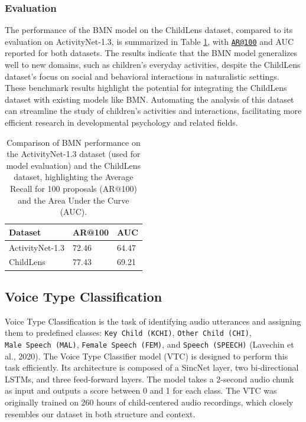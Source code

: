 \documentclass[
  man,floatsintext]{apa6}
\begin{document}
\subsubsection{Evaluation}\label{evaluation}

The performance of the BMN model on the ChildLens dataset, compared to its evaluation on ActivityNet-1.3, is summarized in Table \ref{tab:bmn-results}, with \href{mailto:AR@100}{\nolinkurl{AR@100}} and AUC reported for both datasets. The results indicate that the BMN model generalizes well to new domains, such as children's everyday activities, despite the ChildLens dataset's focus on social and behavioral interactions in naturalistic settings. These benchmark results highlight the potential for integrating the ChildLens dataset with existing models like BMN. Automating the analysis of this dataset can streamline the study of children's activities and interactions, facilitating more efficient research in developmental psychology and related fields.

\begin{table}[tbp]

\begin{center}
\begin{threeparttable}

\caption{\label{tab:bmn-results}Comparison of BMN performance on the ActivityNet-1.3 dataset (used for model evaluation) and the ChildLens dataset, highlighting the Average Recall for 100 proposals (AR@100) and the Area Under the Curve (AUC).}

\begin{tabular}{lll}
\toprule
Dataset & \multicolumn{1}{c}{AR@100} & \multicolumn{1}{c}{AUC}\\
\midrule
ActivityNet-1.3 & 72.46 & 64.47\\
ChildLens & 77.43 & 69.21\\
\bottomrule
\end{tabular}

\end{threeparttable}
\end{center}

\end{table}

\subsection{Voice Type Classification}\label{voice-type-classification}

Voice Type Classification is the task of identifying audio utterances and assigning them to predefined classes: \texttt{Key\ Child\ (KCHI)}, \texttt{Other\ Child\ (CHI)}, \texttt{Male\ Speech\ (MAL)}, \texttt{Female\ Speech\ (FEM)}, and \texttt{Speech\ (SPEECH)} (Lavechin et al., 2020). The Voice Type Classifier model (VTC) is designed to perform this task efficiently. Its architecture is composed of a SincNet layer, two bi-directional LSTMs, and three feed-forward layers. The model takes a 2-second audio chunk as input and outputs a score between 0 and 1 for each class. The VTC was originally trained on 260 hours of child-centered audio recordings, which closely resembles our dataset in both structure and context.
\end{document}
